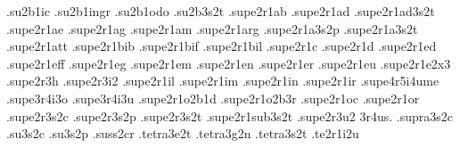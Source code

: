 {.su2b1ic                          %
.su2b1ingr                        %
.su2b1odo                         %
.su2b3s2t                         %
.supe2r1ab                        %
.supe2r1ad                        %
.supe2r1ad3s2t                    %
.supe2r1ae                        %
.supe2r1ag                        %
.supe2r1am                        %
.supe2r1arg                       %
.supe2r1a3s2p                     %
.supe2r1a3s2t                     %
.supe2r1att                       %
.supe2r1bib                       %
.supe2r1bif                       %
.supe2r1bil                       %
.supe2r1c                         %
.supe2r1d                         %
.supe2r1ed                        %
.supe2r1eff                       %
.supe2r1eg                        %
.supe2r1em                        %
.supe2r1en                        %
.supe2r1er                        %
.supe2r1eu                        %
.supe2r1e2x3                      %
.supe2r3h                         %
.supe2r3i2                        %
.supe2r1il                        %
.supe2r1im                        %
.supe2r1in                        %
.supe2r1ir                        %
.supe4r5i4ume                     %
.supe3r4i3o .supe3r4i3u           %
.supe2r1o2b1d                     %
.supe2r1o2b3r                     %
.supe2r1oc                        %
.supe2r1or                        %
.supe2r3s2c                       %
.supe2r3s2p                       %
.supe2r3s2t                       %
.supe2r1sub3s2t                   %
.supe2r3u2                        %
3r4us.                            %
.supra3s2c                        %
.su3s2c .su3s2p                   %
.suss2cr                          %
.tetra3e2t                        %
.tetra3g2n                        %
.tetra3s2t                        %
.te2r1i2u                         %
}
